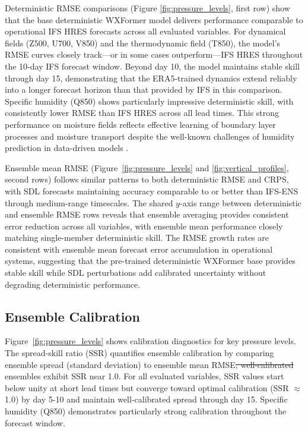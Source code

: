 \documentclass{agujournal2019}
\providecommand{\DIFadd}[1]{{\protect\color{blue}\uwave{#1}}} %
\providecommand{\DIFdel}[1]{{\protect\color{red}\sout{#1}}}                      %
\providecommand{\DIFaddbegin}{} %
\providecommand{\DIFaddend}{} %
\providecommand{\DIFdelbegin}{} %
\providecommand{\DIFdelend}{} %
\begin{document}
Deterministic RMSE comparisons (Figure \ref{fig:pressure_levels}, first row) show that the base deterministic WXFormer model delivers performance comparable to operational IFS HRES forecasts across all evaluated variables. For dynamical fields (Z500, U700, V850) and the thermodynamic field (T850), the model’s RMSE curves closely track—or in some cases outperform—IFS HRES throughout the 10-day IFS forecast window. Beyond day 10, the model maintains stable skill through day 15, demonstrating that the ERA5-trained dynamics extend reliably into a longer forecast horizon than that provided by IFS in this comparison. Specific humidity (Q850) shows particularly impressive deterministic skill, with consistently lower RMSE than IFS HRES across all lead times. This strong performance on moisture fields reflects effective learning of boundary layer processes and moisture transport despite the well-known challenges of humidity prediction in data-driven models \cite{bi2023pangu, Lam2023graphcast}.

Ensemble mean RMSE (Figure~\ref{fig:pressure_levels} and \ref{fig:vertical_profiles}, second rows) follows similar patterns to both deterministic RMSE and CRPS, with SDL forecasts maintaining accuracy comparable to or better than IFS-ENS through medium-range timescales. The shared $y$-axis range between deterministic and ensemble RMSE rows reveals that ensemble averaging provides consistent error reduction across all variables, with ensemble mean performance closely matching single-member deterministic skill. The RMSE growth rates are consistent with ensemble mean forecast error accumulation in operational systems, suggesting that the pre-trained deterministic WXFormer base provides stable skill while SDL perturbations add calibrated uncertainty without degrading deterministic performance.

\subsection{Ensemble Calibration}

Figure~\ref{fig:pressure_levels} shows calibration diagnostics for key pressure levels. The spread-skill ratio (SSR) quantifies ensemble calibration by comparing ensemble spread (standard deviation) to ensemble mean RMSE\DIFdelbegin \DIFdel{; well-calibrated }\DIFdelend \DIFaddbegin \DIFadd{. Well-calibrated }\DIFaddend ensembles exhibit SSR near 1.0. For all evaluated variables, SSR values start below unity at short lead times but converge toward optimal calibration (SSR $\approx$ 1.0) by day 5-10 and maintain well-calibrated spread through day 15. Specific humidity (Q850) demonstrates particularly strong calibration throughout the forecast window.
\end{document}
